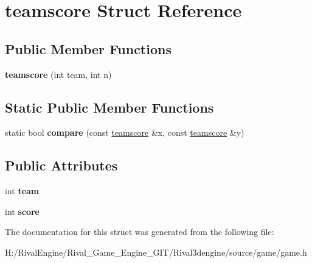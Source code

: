 \hypertarget{structteamscore}{}\section{teamscore Struct Reference}
\label{structteamscore}
\subsection*{Public Member Functions}
\begin{DoxyCompactItemize}
\item 
\mbox{\label{structteamscore_af2fbce40d370d62e209f2bc264023666}} 
{\bfseries teamscore} (int team, int n)
\end{DoxyCompactItemize}
\subsection*{Static Public Member Functions}
\begin{DoxyCompactItemize}
\item 
\mbox{\label{structteamscore_a2e979f58ab74f2f494276b0ec21ab1c6}} 
static bool {\bfseries compare} (const \hyperlink{structteamscore}{teamscore} \&x, const \hyperlink{structteamscore}{teamscore} \&y)
\end{DoxyCompactItemize}
\subsection*{Public Attributes}
\begin{DoxyCompactItemize}
\item 
\mbox{\label{structteamscore_a3f57429297cce2476d1b845e83527827}} 
int {\bfseries team}
\item 
\mbox{\label{structteamscore_a7897909ce96cf8842cdb72bf4b10e09d}} 
int {\bfseries score}
\end{DoxyCompactItemize}


The documentation for this struct was generated from the following file\+:\begin{DoxyCompactItemize}
\item 
H\+:/\+Rival\+Engine/\+Rival\+\_\+\+Game\+\_\+\+Engine\+\_\+\+G\+I\+T/\+Rival3dengine/source/game/game.\+h\end{DoxyCompactItemize}
